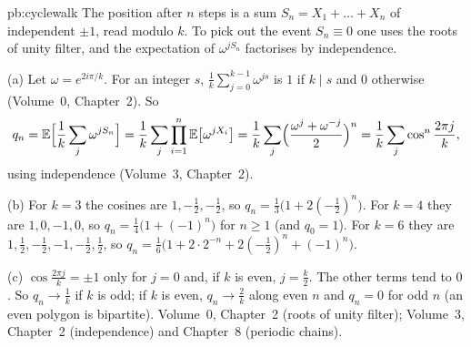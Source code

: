 \begin{solution}{pb:cyclewalk}
\idea The position after $n$ steps is a sum $S_n=X_1+\dots+X_n$ of independent $\pm1$, read modulo $k$. To pick out the event
$S_n\equiv0$ one uses the roots of unity filter, and the expectation of $\omega^{jS_n}$ factorises by independence.

\writeup (a) Let $\omega=e^{2i\pi/k}$. For an integer $s$, $\frac1k\sum_{j=0}^{k-1}\omega^{js}$ is $1$ if $k\mid s$ and $0$
otherwise (Volume~0, Chapter~2). So
\[
q_n=\mathbb E\Bigl[\frac1k\sum_j\omega^{jS_n}\Bigr]=\frac1k\sum_j\prod_{i=1}^n\mathbb E\bigl[\omega^{jX_i}\bigr]
=\frac1k\sum_j\Bigl(\frac{\omega^j+\omega^{-j}}2\Bigr)^n=\frac1k\sum_j\cos^n\frac{2\pi j}k,
\]
using independence (Volume~3, Chapter~2).

(b) For $k=3$ the cosines are $1,-\frac12,-\frac12$, so $q_n=\frac13\bigl(1+2(-\frac12)^n\bigr)$. For $k=4$ they are
$1,0,-1,0$, so $q_n=\frac14\bigl(1+(-1)^n\bigr)$ for $n\ge1$ (and $q_0=1$). For $k=6$ they are $1,\frac12,-\frac12,-1,-\frac12,
\frac12$, so $q_n=\frac16\bigl(1+2\cdot2^{-n}+2(-\frac12)^n+(-1)^n\bigr)$.

(c) $\cos\frac{2\pi j}k=\pm1$ only for $j=0$ and, if $k$ is even, $j=\frac k2$. The other terms tend to $0$. So $q_n\to\frac1k$
if $k$ is odd; if $k$ is even, $q_n\to\frac2k$ along even $n$ and $q_n=0$ for odd $n$ (an even polygon is bipartite).
\tools Volume~0, Chapter~2 (roots of unity filter); Volume~3, Chapter~2 (independence) and Chapter~8 (periodic chains).
\end{solution}

